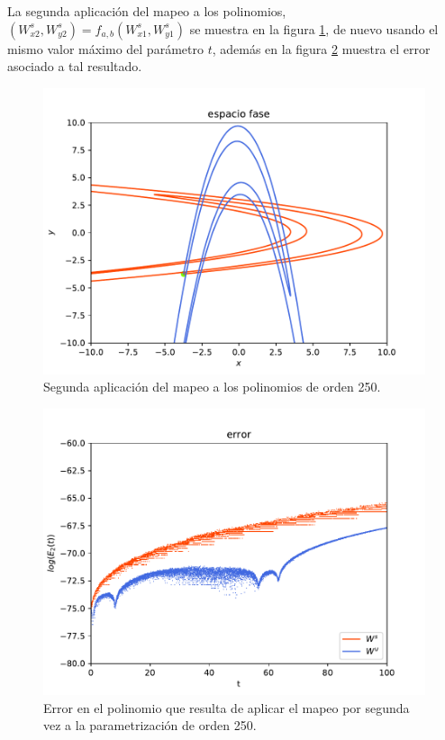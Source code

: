 La segunda aplicación del mapeo a los polinomios, $(W_{x2}^{s},W_{y2}^{s})=f_{a,b}(W_{x1}^{s},W_{y1}^{s})$ se muestra en la figura \ref{Rectangulo2}, de nuevo usando el mismo valor máximo del parámetro $t$, además en la figura \ref{error-2iteracion} muestra el error asociado a tal resultado.\\
\begin{figure}[h!]
\centering
\includegraphics[scale=0.7]{rectangulo2.pdf}
\caption{Segunda aplicación del mapeo a los polinomios de orden 250.}
\label{Rectangulo2}
\end{figure}

\begin{figure}[h!]
\centering
\includegraphics[scale=0.7]{error2ite.pdf}
\caption{Error en el polinomio que resulta de aplicar el mapeo por segunda vez a la parametrización de orden 250.}
\label{error-2iteracion}
\end{figure}

